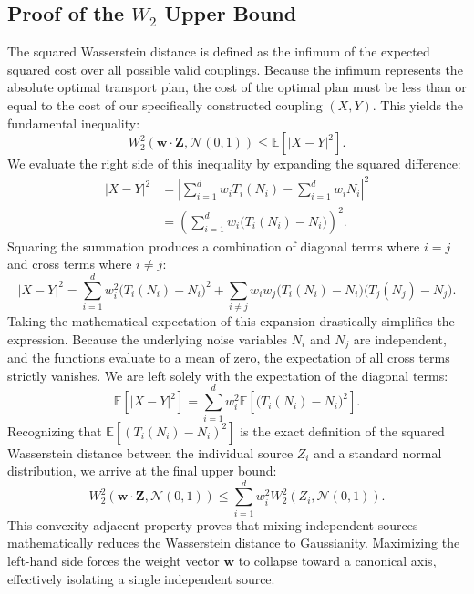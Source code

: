 \documentclass[12pt,a4paper,twoside,openany]{book}
\begin{document}
\subsection{Proof of the $W_2$ Upper Bound}
The squared Wasserstein distance is defined as the infimum of the expected squared cost over all possible valid couplings. 
Because the infimum represents the absolute optimal transport plan, the cost of the optimal plan must be less than or equal to the cost of our 
specifically constructed coupling $(X, Y)$. This yields the fundamental inequality:
\begin{equation}
    W_2^2(\mathbf{w} \cdot \mathbf{Z}, \mathcal{N}(0,1)) \le \mathbb{E}\left[|X - Y|^2\right].
\end{equation}
We evaluate the right side of this inequality by expanding the squared difference:
\begin{align}
    |X - Y|^2 &= \left| \sum_{i=1}^d w_i T_i(N_i) - \sum_{i=1}^d w_i N_i \right|^2 \nonumber \\
              &= \left( \sum_{i=1}^d w_i \big(T_i(N_i) - N_i\big) \right)^2.
\end{align}
Squaring the summation produces a combination of diagonal terms where $i=j$ and cross terms where $i \neq j$:
\begin{equation}
    |X - Y|^2 = \sum_{i=1}^d w_i^2 \big(T_i(N_i) - N_i\big)^2 + \sum_{i \neq j} w_i w_j \big(T_i(N_i) - N_i\big)\big(T_j(N_j) - N_j\big).
\end{equation}
Taking the mathematical expectation of this expansion drastically simplifies the expression. Because the underlying noise variables $N_i$ and $N_j$ are independent, 
and the functions evaluate to a mean of zero, the expectation of all cross terms strictly vanishes. We are left solely with the expectation of the diagonal terms:
\begin{equation}
    \mathbb{E}\left[|X - Y|^2\right] = \sum_{i=1}^d w_i^2 \mathbb{E}\left[ \big(T_i(N_i) - N_i\big)^2 \right].
\end{equation}
Recognizing that $\mathbb{E}[ (T_i(N_i) - N_i)^2 ]$ is the exact definition of the squared Wasserstein distance between the individual source $Z_i$ and a 
standard normal distribution, we arrive at the final upper bound:
\begin{equation}
    W_2^2(\mathbf{w} \cdot \mathbf{Z}, \mathcal{N}(0,1)) \le \sum_{i=1}^d w_i^2 W_2^2(Z_i, \mathcal{N}(0,1)).
\end{equation}
This convexity adjacent property proves that mixing independent sources mathematically reduces the Wasserstein distance to Gaussianity. 
Maximizing the left-hand side forces the weight vector $\mathbf{w}$ to collapse toward a canonical axis, effectively isolating a single independent source.
\end{document}

